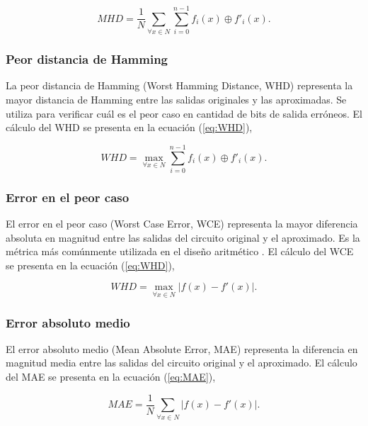 \begin{equation} \label{eq:MHD}
  MHD = \frac{1}{N} \sum_{\forall x \in N} \sum_{i=0}^{n-1} f_i(x) \oplus f'_i(x).
\end{equation}

\subsubsection{Peor distancia de Hamming}

La peor distancia de Hamming (Worst Hamming Distance, WHD) representa la mayor
distancia de Hamming entre las salidas originales y las aproximadas. Se utiliza
para verificar cuál es el peor caso en cantidad de bits de salida erróneos. El
cálculo del WHD se presenta en la ecuación (\ref{eq:WHD}),

\begin{equation} \label{eq:WHD}
  WHD = \max_{\forall x \in N} \sum_{i=0}^{n-1} f_i(x) \oplus f'_i(x).
\end{equation}

\subsubsection{Error en el peor caso}

El error en el peor caso (Worst Case Error, WCE) representa la mayor diferencia
absoluta en magnitud entre las salidas del circuito original y el aproximado.
Es la métrica más comúnmente utilizada en el diseño aritmético
\cite{ammes_two-level_2022}. El cálculo del WCE se presenta en la ecuación
(\ref{eq:WHD}),

\begin{equation} \label{eq:WCE}
  WHD = \max_{\forall x \in N} \left| f(x) - f'(x) \right|.
\end{equation}

\subsubsection{Error absoluto medio}

El error absoluto medio (Mean Absolute Error, MAE) representa la diferencia en
magnitud media entre las salidas del circuito original y el aproximado. El
cálculo del MAE se presenta en la ecuación (\ref{eq:MAE}),

\begin{equation} \label{eq:MAE}
  MAE = \frac{1}{N} \sum_{\forall x \in N} \left| f(x) - f'(x) \right|.
\end{equation}

